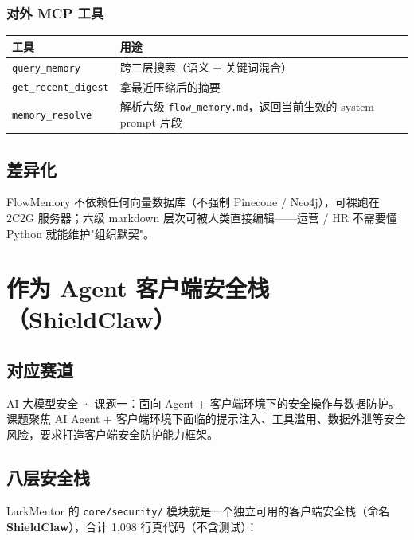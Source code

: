 \documentclass[11pt,a4paper]{ctexart}
\begin{document}
\subsubsection{对外 MCP 工具}

\begin{tabular}{p{4cm}p{10cm}}
\toprule
\textbf{工具} & \textbf{用途} \\
\midrule
\texttt{query\_memory} & 跨三层搜索（语义 + 关键词混合）\\
\texttt{get\_recent\_digest} & 拿最近压缩后的摘要 \\
\texttt{memory\_resolve} & 解析六级 \texttt{flow\_memory.md}，返回当前生效的 system prompt 片段 \\
\bottomrule
\end{tabular}

\subsection{差异化}

FlowMemory 不依赖任何向量数据库（不强制 Pinecone / Neo4j），可裸跑在 2C2G 服务器；六级 markdown 层次可被人类直接编辑——运营 / HR 不需要懂 Python 就能维护"组织默契"。

\section{作为 Agent 客户端安全栈（ShieldClaw）}

\subsection{对应赛道}
AI 大模型安全 · 课题一：面向 Agent + 客户端环境下的安全操作与数据防护。课题聚焦 AI Agent + 客户端环境下面临的提示注入、工具滥用、数据外泄等安全风险，要求打造客户端安全防护能力框架。

\subsection{八层安全栈}

LarkMentor 的 \texttt{core/security/} 模块就是一个独立可用的客户端安全栈（命名 \textbf{ShieldClaw}），合计 1{,}098 行真代码（不含测试）：
\end{document}
